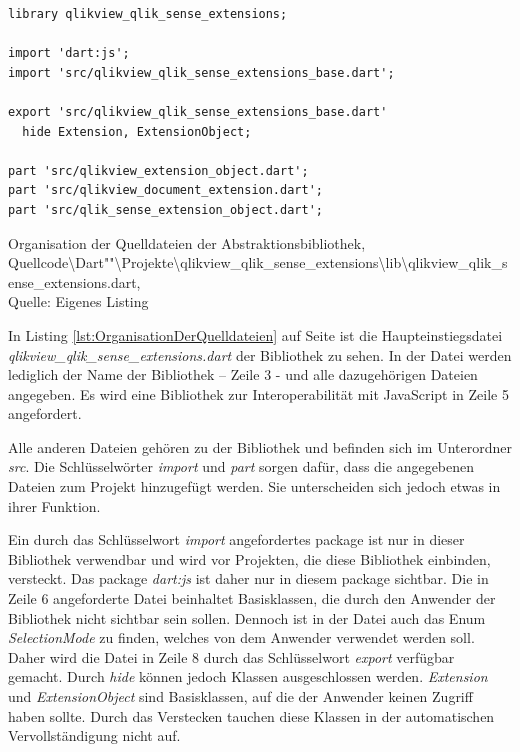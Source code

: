 \begin{listing}[htbp]
\begin{verbatim}
library qlikview_qlik_sense_extensions;

import 'dart:js';
import 'src/qlikview_qlik_sense_extensions_base.dart';

export 'src/qlikview_qlik_sense_extensions_base.dart'
  hide Extension, ExtensionObject;

part 'src/qlikview_extension_object.dart';
part 'src/qlikview_document_extension.dart';
part 'src/qlik_sense_extension_object.dart';
\end{verbatim}
\caption[Organisation der Quelldateien der Abstraktionsbibliothek]{Organisation der Quelldateien der Abstraktionsbibliothek, Quellcode\textbackslash{}Dart""\textbackslash{}Projekte\textbackslash{}qlikview\_qlik\_sense\_extensions\textbackslash{}lib\textbackslash{}qlikview\_qlik\_sense\_extensions.dart, \\Quelle: Eigenes Listing}
\label{lst:OrganisationDerQuelldateien}
\end{listing}

In Listing \ref{lst:OrganisationDerQuelldateien} auf Seite \pageref{lst:OrganisationDerQuelldateien} ist die Haupteinstiegsdatei \textit{qlikview\_qlik\_sense\_extensions.dart} der Bibliothek zu sehen. In der Datei werden lediglich der Name der Bibliothek – Zeile 3 - und alle dazugehörigen Dateien angegeben. Es wird eine Bibliothek zur Interoperabilität mit JavaScript in Zeile 5 angefordert. 

Alle anderen Dateien gehören zu der Bibliothek und befinden sich im Unterordner \textit{src}. Die Schlüsselwörter \textit{import} und \textit{part} sorgen dafür, dass die angegebenen Dateien zum Projekt hinzugefügt werden. Sie unterscheiden sich jedoch etwas in ihrer Funktion. 

Ein durch das Schlüssel\-wort \textit{import} angefordertes package ist nur in dieser Bibliothek verwendbar und wird vor Projekten, die diese Bibliothek einbinden, versteckt. Das package \textit{dart:js} ist daher nur in diesem package sichtbar. Die in Zeile 6 angeforderte Datei beinhaltet Basisklassen, die durch den Anwender der Bibliothek nicht sichtbar sein sollen. Dennoch ist in der Datei auch das Enum \textit{SelectionMode} zu finden, welches von dem Anwender verwendet werden soll. Daher wird die Datei in Zeile 8 durch das Schlüssel\-wort \textit{export} verfügbar gemacht. Durch \textit{hide} können jedoch Klassen ausgeschlossen werden. \textit{Extension} und \textit{ExtensionObject} sind Basisklassen, auf die der Anwender keinen Zugriff haben sollte. Durch das Verstecken tauchen diese Klassen in der automatischen Vervollständigung nicht auf.

